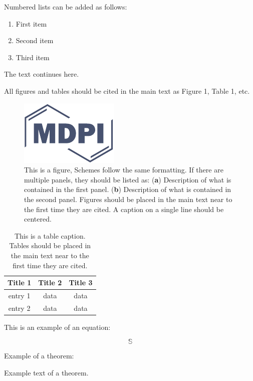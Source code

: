 \documentclass[psych,article,submit,moreauthors,pdftex]{mdpi}
\providecommand{\tightlist}{%
  \setlength{\itemsep}{0pt}\setlength{\parskip}{4pt}}
\begin{document}
Numbered lists can be added as follows:

\begin{enumerate}
\def\labelenumi{\arabic{enumi}.}
\tightlist
\item
  First item
\item
  Second item
\item
  Third item
\end{enumerate}

The text continues here.

All figures and tables should be cited in the main text as Figure 1,
Table 1, etc.

\begin{figure}[H]
\centering
\includegraphics[width=3 cm]{logo-mdpi}
\caption{This is a figure, Schemes follow the same formatting. If there are multiple panels, they should be listed as: (\textbf{a}) Description of what is contained in the first panel. (\textbf{b}) Description of what is contained in the second panel. Figures should be placed in the main text near to the first time they are cited. A caption on a single line should be centered.}
\end{figure}

\begin{table}[H]
\caption{This is a table caption. Tables should be placed in the main text near to the first time they are cited.}
\centering
\begin{tabular}{ccc}
\toprule
\textbf{Title 1}    & \textbf{Title 2}  & \textbf{Title 3}\\
\midrule
entry 1     & data          & data\\
entry 2     & data          & data\\
\bottomrule
\end{tabular}
\end{table}

This is an example of an equation:

\begin{equation}
\mathbb{S}
\end{equation}

Example of a theorem:

\begin{Theorem}
Example text of a theorem.
\end{Theorem}
\end{document}
